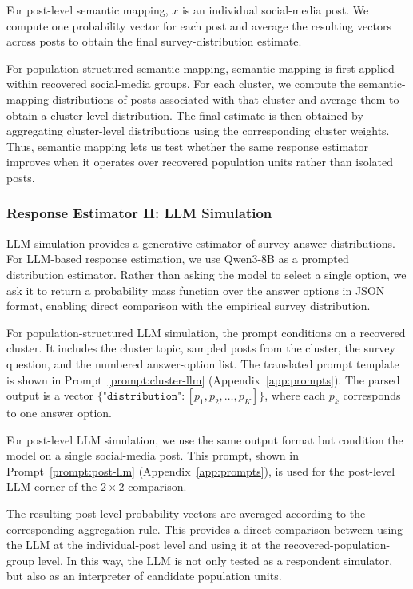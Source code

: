 \documentclass{article}
\begin{document}
For post-level semantic mapping, $x$ is an individual social-media post.
We compute one probability vector for each post and average the resulting vectors across
posts to obtain the final survey-distribution estimate.

For population-structured semantic mapping, semantic mapping is first applied within
recovered social-media groups.
For each cluster, we compute the semantic-mapping distributions of posts associated with
that cluster and average them to obtain a cluster-level distribution.
The final estimate is then obtained by aggregating cluster-level distributions using the
corresponding cluster weights.
Thus, semantic mapping lets us test whether the same response estimator improves when it
operates over recovered population units rather than isolated posts.

\subsubsection{Response Estimator II: LLM Simulation}
\label{LLM_prompt}

LLM simulation provides a generative estimator of survey answer distributions.
For LLM-based response estimation, we use Qwen3-8B as a prompted distribution estimator.
Rather than asking the model to select a single option, we ask it to return a probability
mass function over the answer options in JSON format, enabling direct comparison with the
empirical survey distribution.

For population-structured LLM simulation, the prompt conditions on a recovered cluster.
It includes the cluster topic, sampled posts from the cluster, the survey question, and
the numbered answer-option list.
The translated prompt template is shown in Prompt~\ref{prompt:cluster-llm}
(Appendix~\ref{app:prompts}).
The parsed output is a vector
$\{\texttt{"distribution"}: [p_1, p_2, \ldots, p_K]\}$,
where each $p_k$ corresponds to one answer option.

For post-level LLM simulation, we use the same output format but condition the model on a
single social-media post.
This prompt, shown in Prompt~\ref{prompt:post-llm} (Appendix~\ref{app:prompts}), is used
for the post-level LLM corner of the $2\times2$ comparison.

The resulting post-level probability vectors are averaged according to the corresponding
aggregation rule.
This provides a direct comparison between using the LLM at the individual-post level and
using it at the recovered-population-group level.
In this way, the LLM is not only tested as a respondent simulator, but also as an
interpreter of candidate population units.
\end{document}
